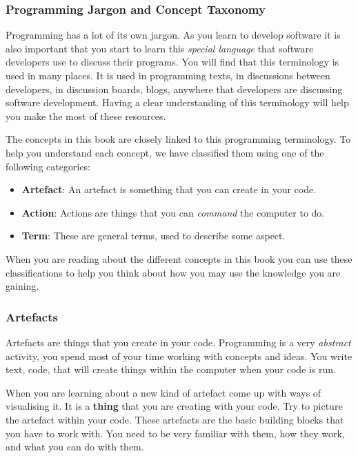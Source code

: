 \clearpage
\subsubsection{Programming Jargon and Concept Taxonomy} %
\label{sub:concept_taxonomy}

Programming has a lot of its own jargon. As you learn to develop software it is also important that you start to learn this \emph{special language} that software developers use to discuss their programs. You will find that this terminology is used in many places. It is used in programming texts, in discussions between developers, in discussion boards, blogs, anywhere that developers are discussing software development. Having a clear understanding of this terminology will help you make the most of these resources.

The concepts in this book are closely linked to this programming terminology. To help you understand each concept, we have classified them using one of the following categories:

\begin{itemize}
  \item \textbf{Artefact}: An artefact is something that you can create in your code.
  \item \textbf{Action}: Actions are things that you can \emph{command} the computer to do.
  \item \textbf{Term}: These are general terms, used to describe some aspect.
\end{itemize}

When you are reading about the different concepts in this book you can use these classifications to help you think about how you may use the knowledge you are gaining.

\subsubsection{Artefacts} %
\label{ssub:artefacts}

Artefacts are things that you create in your code. Programming is a very \emph{abstract} activity, you spend most of your time working with concepts and ideas. You write text, code, that will create things within the computer when your code is run. 

When you are learning about a new kind of artefact come up with ways of visualising it. It is a \textbf{thing} that you are creating with your code. Try to picture the artefact within your code. These artefacts are the basic building blocks that you have to work with. You need to be very familiar with them, how they work, and what you can do with them.

